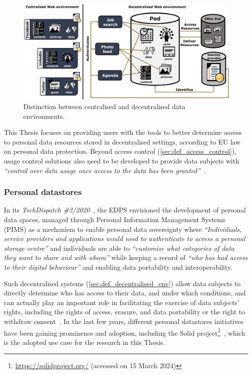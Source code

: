 \begin{figure}[h]
    \centering
    \includegraphics[width=\linewidth]{figures/chapter-1/decentralisation.png}
    \caption{Distinction between centralised and decentralised data environments.}
    \label{fig:decentralisation}
\end{figure}

This Thesis focuses on providing users with the tools to better determine access to personal data resources stored in decentralised settings, according to EU law on personal data protection.
Beyond access control (\ref{sec:def_access_control}), usage control solutions also need to be developed to provide data subjects with \textit{``control over data usage once access to the data has been granted''}~\citep{akaichi_semantic_2022}.

\subsubsection{Personal datastores}
\label{sec:def_pds}

In its \textit{TechDispatch \#3/2020}~\citep{european_data_protection_supervisor_techdispatch_2021}, the EDPS envisioned the development of personal data spaces, managed through Personal Information Management Systems (PIMS) as a mechanism to enable personal data sovereignty where \textit{``Individuals, service providers and applications would need to authenticate to access a personal storage centre''} and individuals are able to \textit{``customize what categories of data they want to share and with whom''} while keeping a record of \textit{``who has had access to their digital behaviour''} and enabling data portability and interoperability.

Such decentralised systems (\ref{sec:def_decentralised_env}) allow data subjects to directly determine who has access to their data, and under which conditions, and can actually play an important role in facilitating the exercise of data subjects’ rights, including the rights of access, erasure, and data portability or the right to withdraw consent~\citep{janssen_personal_2020}.
In the last few years, different personal datastores initiatives have been gaining prominence and adoption, including the Solid project\footnote{\url{https://solidproject.org/} (accessed on 15 March 2024)}~\citep{fallatah_personal_2023}, which is the adopted use case for the research in this Thesis.

